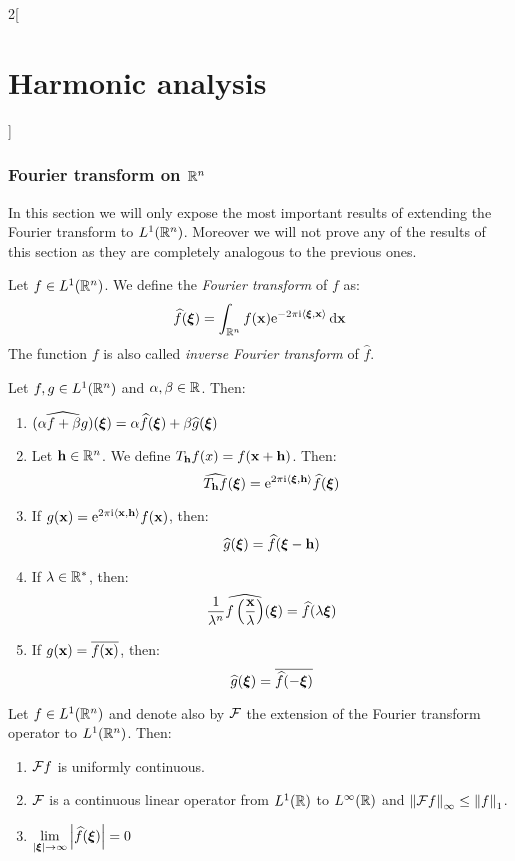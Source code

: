 \documentclass[../../../main_math.tex]{subfiles}
\begin{document}
\begin{multicols}{2}[\section{Harmonic analysis}]
  \subsubsection{Fourier transform on \texorpdfstring{$\mathbb{R}^n$}{Rn}}
  In this section we will only expose the most important results of extending the Fourier transform to $L^1(\mathbb{R}^n)$. Moreover we will not prove any of the results of this section as they are completely analogous to the previous ones.
  \begin{definition}
    Let $f\in L^1(\mathbb{R}^n)$. We define the \emph{Fourier transform} of $f$ as:
    $$\widehat{f}(\boldsymbol{\mathrm{\xi}})=\int_{\mathbb{R}^n}f(\boldsymbol{\mathrm{x}})\mathrm{e}^{-2\pi \mathrm{i}\langle \boldsymbol{\mathrm{\xi}}, \boldsymbol{\mathrm{x}}\rangle}\dd{\boldsymbol{\mathrm{x}}}$$
    The function $f$ is also called \emph{inverse Fourier transform} of $\widehat{f}$.
  \end{definition}
  \begin{proposition}
    Let $f,g\in L^1(\mathbb{R}^n)$ and $\alpha,\beta\in\mathbb{R}$. Then:
    \begin{enumerate}
      \item $\widehat{(\alpha f+\beta g)}(\boldsymbol{\mathrm{\xi}})=\alpha\widehat{f}(\boldsymbol{\mathrm{\xi}})+\beta \widehat{g}(\boldsymbol{\mathrm{\xi}})$
      \item Let $\boldsymbol{\mathrm{h}}\in\mathbb{R}^n$. We define $T_{\boldsymbol{\mathrm{h}}}f(x)=f(\boldsymbol{\mathrm{x}}+\boldsymbol{\mathrm{h}})$. Then: $$\widehat{T_{\boldsymbol{\mathrm{h}}}f}(\boldsymbol{\mathrm{\xi}})=\mathrm{e}^{2\pi\mathrm{i} \langle\boldsymbol{\mathrm{\xi}}, \boldsymbol{\mathrm{h}}\rangle}\widehat{f}(\boldsymbol{\mathrm{\xi}})$$
      \item If $g(\boldsymbol{\mathrm{x}})=\mathrm{e}^{2\pi\mathrm{i} \langle\boldsymbol{\mathrm{x}}, \boldsymbol{\mathrm{h}}\rangle}f(\boldsymbol{\mathrm{x}})$, then: $$\widehat{g}(\boldsymbol{\mathrm{\xi}})=\widehat{f}(\boldsymbol{\mathrm{\xi}}-\boldsymbol{\mathrm{h}})$$
      \item If $\lambda\in\mathbb{R}^*$, then: $$\frac{1}{\lambda^n}\widehat{f\left(\frac{\boldsymbol{\mathrm{x}}}{\lambda}\right)}(\boldsymbol{\mathrm{\xi}})=\widehat{f}(\lambda\boldsymbol{\mathrm{\xi}})$$
      \item If $g(\boldsymbol{\mathrm{x}})=\overline{f(\boldsymbol{\mathrm{x}})}$, then: $$\widehat{g}(\boldsymbol{\mathrm{\xi}})=\overline{\widehat{f}(-\boldsymbol{\mathrm{\xi}})}$$
    \end{enumerate}
  \end{proposition}
  \begin{theorem}
    Let $f\in L^1(\mathbb{R}^n)$ and denote also by $\mathcal{F}$ the extension of the Fourier transform operator to $L^1(\mathbb{R}^n)$. Then:
    \begin{enumerate}
      \item $\mathcal{F} f$ is uniformly continuous.
      \item $\mathcal{F}$ is a continuous linear operator from $L^1(\mathbb{R})$ to $L^\infty(\mathbb{R})$ and $\left\|\mathcal{F} f\right\|_{\infty}\leq \left\|f\right\|_1$.
      \item $\displaystyle\lim_{\abs{\boldsymbol{\mathrm{\xi}}}\to\infty} \abs{\widehat{f}(\boldsymbol{\mathrm{\xi}})}=0$

\end{enumerate}
\end{theorem}
\end{multicols}
\end{document}
